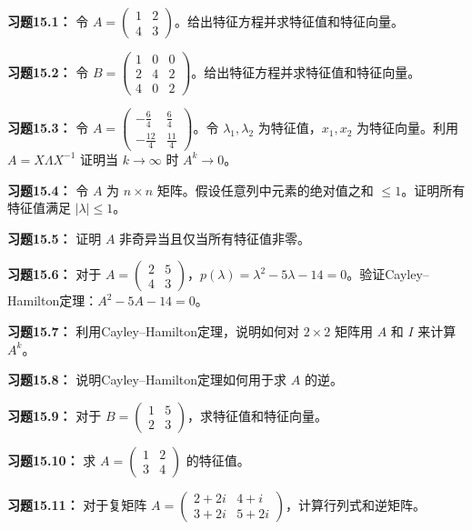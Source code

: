 \begin{translation}
\textbf{习题15.1：} 令 $A = \begin{pmatrix} 1 & 2 \\ 4 & 3 \end{pmatrix}$。给出特征方程并求特征值和特征向量。

\textbf{习题15.2：} 令 $B = \begin{pmatrix} 1 & 0 & 0 \\ 2 & 4 & 2 \\ 4 & 0 & 2 \end{pmatrix}$。给出特征方程并求特征值和特征向量。

\textbf{习题15.3：} 令 $A = \begin{pmatrix} -\frac{6}{4} & \frac{6}{4} \\ -\frac{12}{4} & \frac{11}{4} \end{pmatrix}$。令 $\lambda_1, \lambda_2$ 为特征值，$x_1, x_2$ 为特征向量。利用 $A = X\Lambda X^{-1}$ 证明当 $k \to \infty$ 时 $A^k \to 0$。

\textbf{习题15.4：} 令 $A$ 为 $n \times n$ 矩阵。假设任意列中元素的绝对值之和 $\le 1$。证明所有特征值满足 $|\lambda| \le 1$。

\textbf{习题15.5：} 证明 $A$ 非奇异当且仅当所有特征值非零。

\textbf{习题15.6：} 对于 $A = \begin{pmatrix} 2 & 5 \\ 4 & 3 \end{pmatrix}$，$p(\lambda) = \lambda^2 - 5\lambda - 14 = 0$。验证Cayley--Hamilton定理：$A^2 - 5A - 14 = 0$。

\textbf{习题15.7：} 利用Cayley--Hamilton定理，说明如何对 $2 \times 2$ 矩阵用 $A$ 和 $I$ 来计算 $A^k$。

\textbf{习题15.8：} 说明Cayley--Hamilton定理如何用于求 $A$ 的逆。

\textbf{习题15.9：} 对于 $B = \begin{pmatrix} 1 & 5 \\ 2 & 3 \end{pmatrix}$，求特征值和特征向量。

\textbf{习题15.10：} 求 $A = \begin{pmatrix} 1 & 2 \\ 3 & 4 \end{pmatrix}$ 的特征值。

\textbf{习题15.11：} 对于复矩阵 $A = \begin{pmatrix} 2+2i & 4+i \\ 3+2i & 5+2i \end{pmatrix}$，计算行列式和逆矩阵。
\end{translation}
